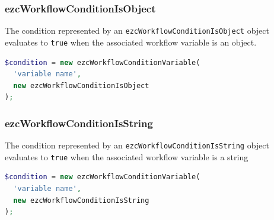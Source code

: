 \subsubsection{ezcWorkflowConditionIsObject}

The condition represented by an \texttt{ezcWorkflowConditionIsObject}
object evaluates to \texttt{true} when the associated workflow variable is
an object.

\begin{lstlisting}[language=PHP]
$condition = new ezcWorkflowConditionVariable(
  'variable name',
  new ezcWorkflowConditionIsObject
);
\end{lstlisting}

\subsubsection{ezcWorkflowConditionIsString}

The condition represented by an \texttt{ezcWorkflowConditionIsString}
object evaluates to \texttt{true} when the associated workflow variable is
a string

\begin{lstlisting}[language=PHP]
$condition = new ezcWorkflowConditionVariable(
  'variable name',
  new ezcWorkflowConditionIsString
);
\end{lstlisting}
